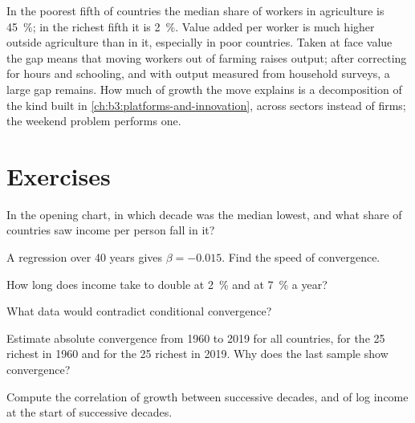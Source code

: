 In the poorest fifth of countries the median share of workers in agriculture is 45~\%; in
the richest fifth it is 2~\%. Value added per worker is much higher outside agriculture than
in it, especially in poor countries. Taken at face value the gap means that moving
workers out of farming raises output; after correcting for hours and schooling, and
with output measured from household surveys, a large gap remains. %
How much of growth the move explains is a decomposition of the kind built in
\cref{ch:b3:platforms-and-innovation}, across sectors instead of firms; the weekend
problem performs one.

\section{Exercises}\label{sec:b3:growth-empirics:exercises}

\begin{exercise}[$\star$]\label{exo:b3:growth-empirics:1}
In the opening chart, in which decade was the median lowest, and what share of
countries saw income per person fall in it?
\end{exercise}

\begin{exercise}[$\star$]\label{exo:b3:growth-empirics:2}
A regression over 40 years gives $\beta = -0.015$. Find the speed of convergence.
\end{exercise}

\begin{exercise}[$\star$]\label{exo:b3:growth-empirics:3}
How long does income take to double at 2~\% and at 7~\% a year?
\end{exercise}

\begin{exercise}[$\star$]\label{exo:b3:growth-empirics:4}
What data would contradict conditional convergence?
\end{exercise}

\begin{exercise}[$\star\star$]\label{exo:b3:growth-empirics:5}
Estimate absolute convergence from 1960 to 2019 for all countries, for the 25 richest in
1960 and for the 25 richest in 2019. Why does the last sample show convergence?
\end{exercise}

\begin{exercise}[$\star\star$]\label{exo:b3:growth-empirics:6}
Compute the correlation of growth between successive decades, and of log income at the
start of successive decades.
\end{exercise}

